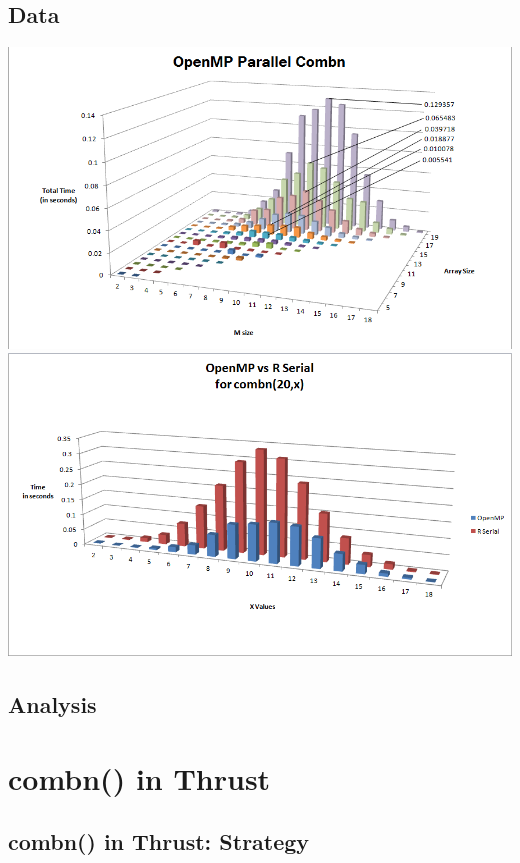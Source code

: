 \documentclass[titlepage, 11pt]{article}
\begin{document}
\subsection{Data}
\includegraphics[scale = 0.5]{3D-OMP.png} \\

\includegraphics[scale = 0.5]{OMPvsR.png}

\subsection{Analysis}

\section{combn() in Thrust}

\subsection{combn() in Thrust: Strategy}
\end{document}

